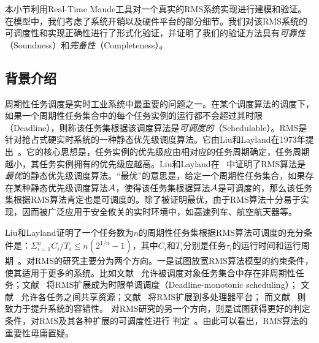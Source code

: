 本小节利用Real-Time Maude工具对一个真实的RMS系统实现进行建模和验证。在模型中，我们考虑了系统开销以及硬件平台的部分细节。我们对该RMS系统的可调度性和实现正确性进行了形式化验证，并证明了我们的验证方法具有\emph{可靠性}（Soundness）和\emph{完备性}（Completeness）。

\subsection{背景介绍}\label{s:introduction}

周期性任务调度是实时工业系统中最重要的问题之一。在某个调度算法的调度下，如果一个周期性任务集合中的每个任务实例的运行都不会超过其时限（Deadline），则称该任务集根据该调度算法是\emph{可调度的}（Schedulable）。RMS是针对抢占式硬实时系统的一种静态优先级调度算法。它由Liu和Layland在1973年提出~\cite{DBLP:journals/jacm/LiuL73}。它的核心思想是，任务实例的优先级应由相对应的任务周期确定，任务周期越小，其任务实例拥有的优先级应越高。Liu和Layland在~ 中证明了RMS算法是\emph{最优}的静态优先级调度算法。“最优”的意思是，给定一个周期性任务集合，如果存在某种静态优先级调度算法$\mathcal{A}$，使得该任务集根据算法$\mathcal{A}$是可调度的，那么该任务集根据RMS算法肯定也是可调度的。除了被证明最优，由于RMS算法十分易于实现，因而被广泛应用于安全攸关的实时环境中，如高速列车、航空航天器等。

Liu和Layland证明了一个任务数为$n$的周期性任务集根据RMS算法可调度的充分条件是：$\Sigma^n_{i=1}C_i/T_i \le n(2^{1/n}-1)$，其中$C_i$和$T_i$分别是任务$\tau_i$的运行时间和运行周期~\cite{DBLP:journals/jacm/LiuL73}。对RMS的研究主要分为两个方向。一是试图放宽RMS算法模型的约束条件，使其适用于更多的系统。比如文献~ 允许被调度对象任务集合中存在非周期性任务；文献~ 将RMS扩展成为时限单调调度（Deadline-monotonic scheduling）；
文献~ 允许各任务之间共享资源；文献~ 将RMS扩展到多处理器平台；
而文献~ 则致力于提升系统的容错性。
对RMS研究的另一个方向，则是试图获得更好的判定条件，对RMS及其各种扩展的可调度性进行
判定~\cite{DBLP:conf/rtss/LehoczkySD89,DBLP:conf/rtss/KuoM91,DBLP:journals/tc/BiniBB03,DBLP:journals/rts/LopezGDG03,DBLP:journals/tc/BaruahG03}。由此可以看出，RMS算法的重要性毋庸置疑。

